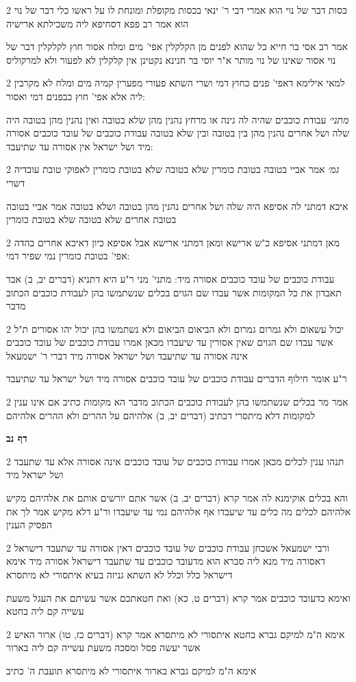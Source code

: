 \documentclass[12pt, openany]{book}
\newcommand{\sethebfont}{
\fontsize{10.5pt}{21.0pt} \selectfont
}
\newcommand{\twocol}[1]{
	{\sethebfont \begin{multicols}{2}
			#1
	\end{multicols}}	
}
\newcommand{\sectname}{}
\newcommand{\newsection}[1]{
	\addcontentsline{toc}{section}{#1}
	\renewcommand{\sectname}{#1}	
	\vspace{-\baselineskip}
	\begin{center}
		\textbf{%
\fontsize{16pt}{16pt}\selectfont
			#1}
	\end{center}
	\vspace{-\baselineskip}
	\nopagebreak
}
\begin{document}
\twocol{כסות דבר של נוי הוא אמרי דבי ר' ינאי בכסות מקופלת ומונחת לו על ראשו כלי דבר של נוי הוא אמר רב פפא דסחיפא ליה משכילתא ארישיה
\par אמר רב אסי בר חייא כל שהוא לפנים מן הקלקלין אפי' מים ומלח אסור חוץ לקלקלין דבר של נוי אסור שאינו של נוי מותר א"ר יוסי בר חנינא נקטינן אין קלקלין לא לפעור ולא למרקוליס}
\twocol{למאי אילימא דאפי' פנים כחוץ דמי ושרי השתא פעורי מפערין קמיה מים ומלח לא מקרבין ליה אלא אפי' חוץ כבפנים דמי ואסור:
\par {\large\emph{מתני׳}} עבודת כוכבים שהיה לה גינה או מרחץ נהנין מהן שלא בטובה ואין נהנין מהן בטובה היה שלה ושל אחרים נהנין מהן בין בטובה ובין שלא בטובה עבודת כוכבים של עובד כוכבים אסורה מיד ושל ישראל אין אסורה עד שתיעבד:}
\twocol{{\large\emph{גמ׳}} אמר אביי בטובה בטובת כומרין שלא בטובה שלא בטובת כומרין לאפוקי טובת עובדיה דשרי
\par איכא דמתני לה אסיפא היה שלה ושל אחרים נהנין מהן בטובה ושלא בטובה אמר אביי בטובה בטובת אחרים שלא בטובה שלא בטובת כומרין}
\twocol{מאן דמתני אסיפא כ"ש ארישא ומאן דמתני ארישא אבל אסיפא כיון דאיכא אחרים בהדה אפי' בטובת כומרין נמי שפיר דמי:
\par עבודת כוכבים של עובד כוכבים אסורה מיד: מתני' מני ר"ע היא דתניא (דברים יב, ב) אבד תאבדון את כל המקומות אשר עבדו שם הגוים בכלים שנשתמשו בהן לעבודת כוכבים הכתוב מדבר}
\twocol{יכול עשאום ולא גמרום גמרום ולא הביאום הביאום ולא נשתמשו בהן יכול יהו אסורים ת"ל אשר עבדו שם הגוים שאין אסורין עד שיעבדו מכאן אמרו עבודת כוכבים של עובד כוכבים אינה אסורה עד שתיעבד ושל ישראל אסורה מיד דברי ר' ישמעאל
\par ר"ע אומר חילוף הדברים עבודת כוכבים של עובד כוכבים אסורה מיד ושל ישראל עד שתיעבד}
\twocol{אמר מר בכלים שנשתמשו בהן לעבודת כוכבים הכתוב מדבר הא מקומות כתיב אם אינו ענין למקומות דלא מיתסרי דכתיב (דברים יב, ב) אלהיהם על ההרים ולא ההרים אלהיהם}
\newsection{דף נב}
\twocol{תנהו ענין לכלים מכאן אמרו עבודת כוכבים של עובד כוכבים אינה אסורה אלא עד שתעבד ושל ישראל מיד
\par והא בכלים אוקימנא לה אמר קרא (דברים יב, ב) אשר אתם יורשים אותם את אלהיהם מקיש אלהיהם לכלים מה כלים עד שיעבדו אף אלהיהם נמי עד שיעבדו ור"ע דלא מקיש אמר לך את הפסיק הענין}
\twocol{ורבי ישמעאל אשכחן עבודת כוכבים של עובד כוכבים דאין אסורה עד שתעבד דישראל דאסורה מיד מנא ליה סברא הוא מדעובד כוכבים עד שתעבד דישראל אסורה מיד אימא דישראל כלל וכלל לא השתא גניזה בעיא איתסורי לא מיתסרא
\par ואימא כדעובד כוכבים אמר קרא (דברים ט, כא) ואת חטאתכם אשר עשיתם את העגל משעת עשייה קם ליה בחטא}
\twocol{אימא ה"מ למיקם גברא בחטא איתסורי לא מיתסרא אמר קרא (דברים כז, טו) ארור האיש אשר יעשה פסל ומסכה משעת עשייה קם ליה בארור
\par אימא ה"מ למיקם גברא בארור איתסורי לא מיתסרא תועבת ה' כתיב}
\end{document}
